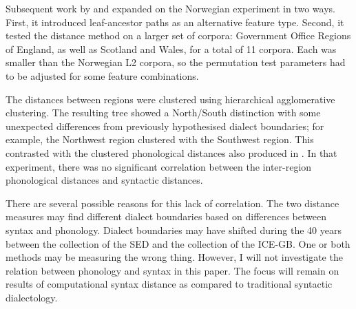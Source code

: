 \documentclass[11pt]{article}
\begin{document}
Subsequent work by  and 
expanded on the Norwegian experiment in two ways. First, it introduced
leaf-ancestor paths as an alternative feature type. Second, it tested
the distance method on a larger set of corpora: Government Office
Regions of England, as well as Scotland and Wales, for a total of
11 corpora. Each was smaller than the Norwegian L2 corpora, so the
permutation test parameters had to be adjusted for some feature
combinations.

The distances between regions were clustered using hierarchical
agglomerative clustering. The resulting tree showed a North/South
distinction with some unexpected differences from previously
hypothesised dialect boundaries; for example, the
Northwest region clustered with the Southwest region. This contrasted
with the clustered phonological distances also produced in
. In that experiment,
there was no significant correlation between the inter-region
phonological distances and syntactic distances.

There are several possible reasons for this lack of correlation. The
two distance measures may find different dialect boundaries based on
differences between syntax and phonology. Dialect boundaries may have
shifted during the 40 years between the collection of the SED and the
collection of the ICE-GB. One or both methods may be measuring the
wrong thing. However, I will not investigate the relation between
phonology and syntax in this paper. The focus will remain on results
of computational syntax distance as compared to traditional syntactic
dialectology.



\end{document}
